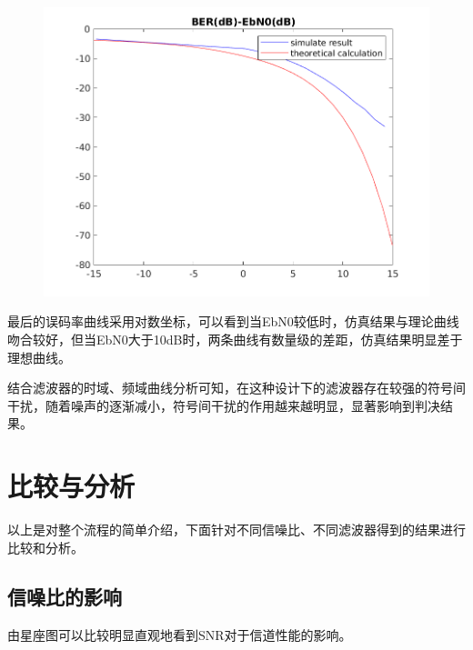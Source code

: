 \begin{spacing}{1.5}
\begin{figure}[H]
\centering
\includegraphics[width = \columnwidth]{BER-EBN0.png}
\end{figure}

最后的误码率曲线采用对数坐标，可以看到当EbN0较低时，仿真结果与理论曲线吻合较好，但当EbN0大于10dB时，两条曲线有数量级的差距，仿真结果明显差于理想曲线。

结合滤波器的时域、频域曲线分析可知，在这种设计下的滤波器存在较强的符号间干扰，随着噪声的逐渐减小，符号间干扰的作用越来越明显，显著影响到判决结果。

\section{比较与分析}

以上是对整个流程的简单介绍，下面针对不同信噪比、不同滤波器得到的结果进行比较和分析。

\subsection{信噪比的影响}

由星座图可以比较明显直观地看到SNR对于信道性能的影响。


\end{spacing}
